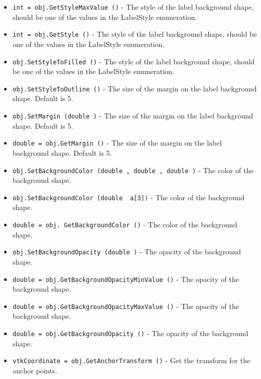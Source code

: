 \begin{itemize}
\item  \verb|int = obj.GetStyleMaxValue ()| -  The style of the label background shape, should be one of the
 values in the LabelStyle enumeration.

\item  \verb|int = obj.GetStyle ()| -  The style of the label background shape, should be one of the
 values in the LabelStyle enumeration.

\item  \verb|obj.SetStyleToFilled ()| -  The style of the label background shape, should be one of the
 values in the LabelStyle enumeration.

\item  \verb|obj.SetStyleToOutline ()| -  The size of the margin on the label background shape.
 Default is 5.

\item  \verb|obj.SetMargin (double )| -  The size of the margin on the label background shape.
 Default is 5.

\item  \verb|double = obj.GetMargin ()| -  The size of the margin on the label background shape.
 Default is 5.

\item  \verb|obj.SetBackgroundColor (double , double , double )| -  The color of the background shape.

\item  \verb|obj.SetBackgroundColor (double  a[3])| -  The color of the background shape.

\item  \verb|double = obj. GetBackgroundColor ()| -  The color of the background shape.

\item  \verb|obj.SetBackgroundOpacity (double )| -  The opacity of the background shape.

\item  \verb|double = obj.GetBackgroundOpacityMinValue ()| -  The opacity of the background shape.

\item  \verb|double = obj.GetBackgroundOpacityMaxValue ()| -  The opacity of the background shape.

\item  \verb|double = obj.GetBackgroundOpacity ()| -  The opacity of the background shape.

\item  \verb|vtkCoordinate = obj.GetAnchorTransform ()| -  Get the transform for the anchor points.

\end{itemize}
